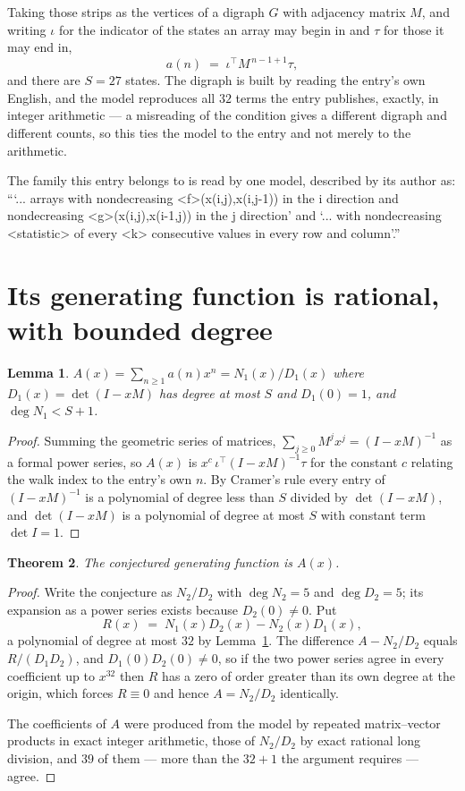 \documentclass[11pt,a4paper]{article}
\theoremstyle{plain}
\newtheorem{theorem}{Theorem}
\newtheorem{lemma}[theorem]{Lemma}
\theoremstyle{definition}
\begin{document}
Taking those strips as the vertices of a digraph $G$ with adjacency matrix $M$, and writing
$\iota$ for the indicator of the states an array may begin in and $\tau$ for those it may end
in,
\[
a(n)\;=\;\iota^{\!\top}M^{\,n-1+1}\tau ,
\]
and there are $S=27$ states. The digraph is built by reading the entry's own English, and the
model reproduces all $32$ terms the entry publishes, exactly, in integer arithmetic --- a
misreading of the condition gives a different digraph and different counts, so this ties the
model to the entry and not merely to the arithmetic.

The family this entry belongs to is read by one model, described by its author as: ```... arrays with nondecreasing <f>(x(i,j),x(i,j-1)) in the i direction and nondecreasing <g>(x(i,j),x(i-1,j)) in the j direction' and `... with nondecreasing <statistic> of every <k> consecutive values in every row and column'.''


\section{Its generating function is rational, with bounded degree}

\begin{lemma}\label{lem:rat}
$A(x)=\sum_{n\ge1}a(n)x^n=N_1(x)/D_1(x)$ where $D_1(x)=\det(I-xM)$ has degree at most
$S$ and $D_1(0)=1$, and $\deg N_1<S+1$.
\end{lemma}

\begin{proof}
Summing the geometric series of matrices, $\sum_{j\ge0}M^jx^j=(I-xM)^{-1}$ as a formal
power series, so $A(x)$ is $x^{c}\,\iota^{\!\top}(I-xM)^{-1}\tau$ for the constant $c$
relating the walk index to the entry's own $n$. By Cramer's rule every entry of
$(I-xM)^{-1}$ is a polynomial of degree less than $S$ divided by $\det(I-xM)$, and
$\det(I-xM)$ is a polynomial of degree at most $S$ with constant term $\det I=1$.
\end{proof}

\begin{theorem}
The conjectured generating function is $A(x)$.
\end{theorem}

\begin{proof}
Write the conjecture as $N_2/D_2$ with $\deg N_2=5$ and $\deg D_2=5$; its expansion as a
power series exists because $D_2(0)\neq0$. Put
\[
R(x)\;=\;N_1(x)D_2(x)-N_2(x)D_1(x),
\]
a polynomial of degree at most $32$ by Lemma~\ref{lem:rat}. The difference
$A-N_2/D_2$ equals $R/(D_1D_2)$, and $D_1(0)D_2(0)\neq0$, so if the two power series agree in
every coefficient up to $x^{32}$ then $R$ has a zero of order greater than its own
degree at the origin, which forces $R\equiv0$ and hence $A=N_2/D_2$ identically.

The coefficients of $A$ were produced from the model by repeated matrix--vector products in
exact integer arithmetic, those of $N_2/D_2$ by exact rational long division, and $39$
of them --- more than the $32+1$ the argument requires --- agree.
\end{proof}
\end{document}
